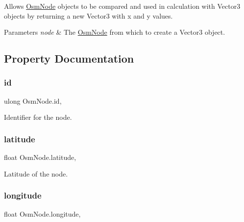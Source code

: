 Allows \mbox{\hyperlink{class_osm_node}{Osm\+Node}} objects to be compared and used in calculation with Vector3 objects by returning a new Vector3 with x and y values. 


\begin{DoxyParams}{Parameters}
{\em node} & The \mbox{\hyperlink{class_osm_node}{Osm\+Node}} from which to create a Vector3 object.\\
\hline
\end{DoxyParams}


\subsection{Property Documentation}
\mbox{\label{class_osm_node_a31333793a614f2f7672bdc8b66867c0a}} 
\subsubsection{\texorpdfstring{id}{id}}
{\footnotesize\ttfamily ulong Osm\+Node.\+id\hspace{0.3cm}{\ttfamily [get]}, {}}



Identifier for the node. 

\mbox{\label{class_osm_node_af5aae5cbf72b4256a6d5fead9252e9bf}} 
\subsubsection{\texorpdfstring{latitude}{latitude}}
{\footnotesize\ttfamily float Osm\+Node.\+latitude\hspace{0.3cm}{\ttfamily [get]}, {}}



Latitude of the node. 

\mbox{\label{class_osm_node_a65db270bef3d8c55822b410ed137ec7c}} 
\subsubsection{\texorpdfstring{longitude}{longitude}}
{\footnotesize\ttfamily float Osm\+Node.\+longitude\hspace{0.3cm}{\ttfamily [get]}, {}}



